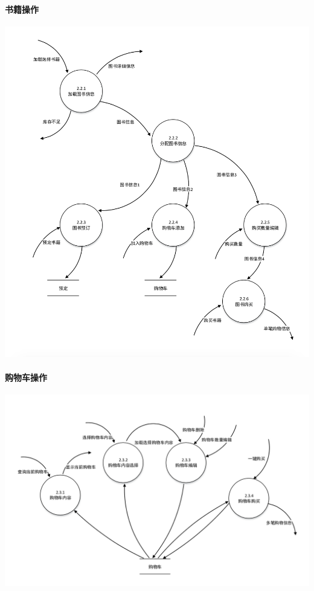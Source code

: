 \paragraph{书籍操作}
\begin{center}
    \includegraphics[width=1\linewidth]{img/2.2.png}
\end{center}
\paragraph{购物车操作}
\begin{center}
    \includegraphics[width=1\linewidth]{img/2.3.png}
\end{center}
